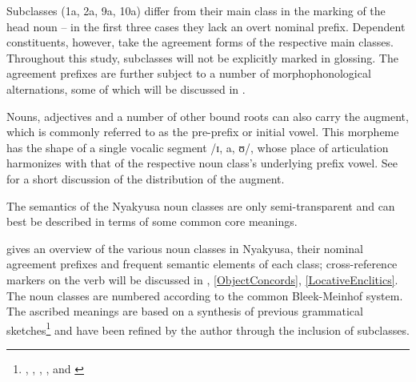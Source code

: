 Subclasses (1a, 2a, 9a, 10a) differ from their main class in the marking of the head noun -- in the first three cases they lack an overt nominal prefix. Dependent constituents, however, take the agreement forms of the respective main classes. Throughout this study, subclasses will not be explicitly marked in glossing. The agreement prefixes are further subject to a number of morphophonological alternations, some of which will be discussed in . 

Nouns, adjectives and a number of other bound roots can also carry the augment, which is commonly referred to as the pre-prefix or initial vowel. This morpheme has the shape of a single vocalic segment /ɪ, a, ʊ/, whose place of articulation harmonizes with that of the respective noun class's underlying prefix vowel. See  for a short discussion of the distribution of the augment.

The semantics of the Nyakyusa noun classes are only semi-transparent and can best be described in terms of some common core meanings.

 gives an overview of the various noun classes in Nyakyusa, their nominal agreement prefixes and frequent semantic elements of each class; cross-reference markers on the verb will be discussed in , \ref{ObjectConcords}, \ref{LocativeEnclitics}. The noun classes are numbered according to the common Bleek-Meinhof system. The ascribed meanings are based on a synthesis of previous grammatical sketches\footnote{\citet{SchumannK1899},  \citet{MeinhofC1966}, \citet{EndemannC1914}, \citet{NurseD1979}, \citet{LusekeloA2007} and \citet{FelbergK1996}} and have been refined by the author through the inclusion of subclasses.


